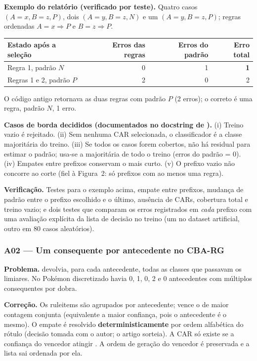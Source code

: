 \documentclass[a4paper,11pt]{article}
\newcommand{\code}[1]{\texttt{\detokenize{#1}}}
\begin{document}
\textbf{Exemplo do relat\'orio (verificado por teste).} Quatro casos $(A{=}x,B{=}z,P)$, dois $(A{=}y,B{=}z,N)$ e um $(A{=}y,B{=}z,P)$; regras ordenadas $A{=}x\Rightarrow P$ e $B{=}z\Rightarrow P$.
\begin{center}\small
\begin{tabular}{lrrr}
\toprule
Estado ap\'os a sele\c{c}\~ao & Erros das regras & Erros do padr\~ao & Erro total\\
\midrule
Regra 1, padr\~ao $N$ & 0 & 1 & \textbf{1}\\
Regras 1 e 2, padr\~ao $P$ & 2 & 0 & 2\\
\bottomrule
\end{tabular}
\end{center}
O c\'odigo antigo retornava as duas regras com padr\~ao $P$ (2 erros); o correto \'e uma regra, padr\~ao $N$, 1 erro.

\textbf{Casos de borda decididos (documentados no docstring de \code{cba.py}).} (i) Treino vazio \'e rejeitado. (ii) Sem nenhuma CAR selecionada, o classificador \'e a classe majorit\'aria do treino. (iii) Se todos os casos forem cobertos, n\~ao h\'a residual para estimar o padr\~ao; usa-se a majorit\'aria de todo o treino (erros do padr\~ao = 0). (iv) Empates entre prefixos conservam o mais curto. (v) O prefixo vazio n\~ao concorre ao corte (fiel \`a Figura~2: s\'o prefixos com ao menos uma regra).

\textbf{Verifica\c{c}\~ao.} Testes para o exemplo acima, empate entre prefixos, mudança de padr\~ao entre o prefixo escolhido e o \'ultimo, aus\^encia de CARs, cobertura total e treino vazio; e dois testes que comparam os erros registrados em \emph{cada} prefixo com uma avalia\c{c}\~ao expl\'icita da lista de decis\~ao no treino (um no dataset artificial, outro em 80 casos aleat\'orios).

\subsubsection{A02 --- Um consequente por antecedente no CBA-RG}
\textbf{Problema.} \code{generate_cars} devolvia, para cada antecedente, todas as classes que passavam os limiares. No Pok\'emon discretizado havia 0, 1, 0, 2 e 0 antecedentes com m\'ultiplos consequentes por dobra.

\textbf{Corre\c{c}\~ao.} Os ruleitems s\~ao agrupados por antecedente; vence o de maior contagem conjunta (equivalente a maior confiança, pois o antecedente \'e o mesmo). O empate \'e resolvido \textbf{deterministicamente} por ordem alfab\'etica do r\'otulo (decis\~ao tomada com o autor; o artigo sorteia). A CAR s\'o existe se a confiança do vencedor atingir \code{min_confidence}. A ordem de gera\c{c}\~ao do vencedor \'e preservada e a lista sai ordenada por ela.
\end{document}
